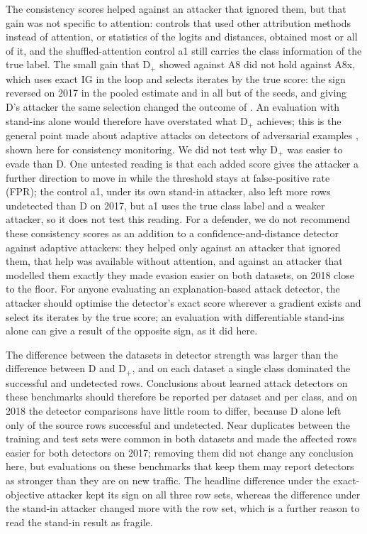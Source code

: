 The consistency scores helped against an attacker that ignored them, but that gain was not specific to attention:
controls that used other attribution methods instead of attention, or statistics of the logits and distances, obtained
most or all of it, and the shuffled-attention control a1 still carries the class information of the true label.
The small gain that D$_+$ showed against A8 did not hold against A8x, which uses exact IG in the loop and selects
iterates by the true score: the sign reversed on 2017 in the pooled estimate and in all but
\axHeadOppSeedsSeventeen{} of the \nSeeds{} seeds, and giving D's attacker the same selection changed the outcome of
\sxOutcomeChangedPhrase.
An evaluation with stand-ins alone would therefore have overstated what D$_+$ achieves; this is the general point made
about adaptive attacks on detectors of adversarial examples \cite{tramer2020}, shown here for consistency monitoring.
We did not test why D$_+$ was easier to evade than D.
One untested reading is that each added score gives the attacker a further direction to move in while the threshold
stays at \paramFPR{} false-positive rate (FPR); the control a1, under its own stand-in attacker, also left more rows
undetected than D on 2017, but a1 uses the true class label and a weaker attacker, so it does not test this reading.
For a defender, we do not recommend these consistency scores as an addition to a confidence-and-distance detector
against adaptive attackers: they helped only against an attacker that ignored them, that help was available without
attention, and against an attacker that modelled them exactly they made evasion easier on both datasets, on 2018
close to the floor.
For anyone evaluating an explanation-based attack detector, the attacker should optimise the detector's exact score
wherever a gradient exists and select its iterates by the true score; an evaluation with differentiable stand-ins alone
can give a result of the opposite sign, as it did here.

The difference between the datasets in detector strength was larger than the difference between D and D$_+$, and on
each dataset a single class dominated the successful and undetected rows.
Conclusions about learned attack detectors on these benchmarks should therefore be reported per dataset and per class,
and on 2018 the detector comparisons have little room to differ, because D alone left only \axHeadVoneEighteenD{} of
the source rows successful and undetected.
Near duplicates between the training and test sets were common in both datasets and made the affected rows easier for
both detectors on 2017; removing them did not change any conclusion here, but evaluations on these benchmarks that keep
them may report detectors as stronger than they are on new traffic.
The headline difference under the exact-objective attacker kept its sign on all three row sets, whereas the difference
under the stand-in attacker changed more with the row set, which is a further reason to read the stand-in result as
fragile.

